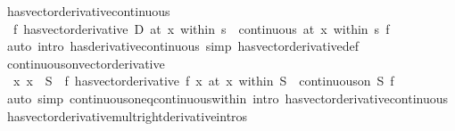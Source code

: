 \begin{isabellebody}
\endisatagproof
{\isafoldproof}%
%
\isadelimproof
\isanewline
%
\endisadelimproof
\isanewline
{}\isamarkupfalse%
\ has{\isacharunderscore}{\kern0pt}vector{\isacharunderscore}{\kern0pt}derivative{\isacharunderscore}{\kern0pt}continuous{\isacharcolon}{\kern0pt}\isanewline
\ \ {\isachardoublequoteopen}{\isacharparenleft}{\kern0pt}f\ has{\isacharunderscore}{\kern0pt}vector{\isacharunderscore}{\kern0pt}derivative\ D{\isacharparenright}{\kern0pt}\ {\isacharparenleft}{\kern0pt}at\ x\ within\ s{\isacharparenright}{\kern0pt}\ {\isasymLongrightarrow}\ continuous\ {\isacharparenleft}{\kern0pt}at\ x\ within\ s{\isacharparenright}{\kern0pt}\ f{\isachardoublequoteclose}\isanewline
%
\isadelimproof
\ \ %
\endisadelimproof
%
\isatagproof
{}\isamarkupfalse%
\ {\isacharparenleft}{\kern0pt}auto\ intro{\isacharcolon}{\kern0pt}\ has{\isacharunderscore}{\kern0pt}derivative{\isacharunderscore}{\kern0pt}continuous\ simp{\isacharcolon}{\kern0pt}\ has{\isacharunderscore}{\kern0pt}vector{\isacharunderscore}{\kern0pt}derivative{\isacharunderscore}{\kern0pt}def{\isacharparenright}{\kern0pt}%
\endisatagproof
{\isafoldproof}%
%
\isadelimproof
\isanewline
%
\endisadelimproof
\isanewline
{}\isamarkupfalse%
\ continuous{\isacharunderscore}{\kern0pt}on{\isacharunderscore}{\kern0pt}vector{\isacharunderscore}{\kern0pt}derivative{\isacharcolon}{\kern0pt}\isanewline
\ \ {\isachardoublequoteopen}{\isacharparenleft}{\kern0pt}{\isasymAnd}x{\isachardot}{\kern0pt}\ x\ {\isasymin}\ S\ {\isasymLongrightarrow}\ {\isacharparenleft}{\kern0pt}f\ has{\isacharunderscore}{\kern0pt}vector{\isacharunderscore}{\kern0pt}derivative\ f{\isacharprime}{\kern0pt}\ x{\isacharparenright}{\kern0pt}\ {\isacharparenleft}{\kern0pt}at\ x\ within\ S{\isacharparenright}{\kern0pt}{\isacharparenright}{\kern0pt}\ {\isasymLongrightarrow}\ continuous{\isacharunderscore}{\kern0pt}on\ S\ f{\isachardoublequoteclose}\isanewline
%
\isadelimproof
\ \ %
\endisadelimproof
%
\isatagproof
{}\isamarkupfalse%
\ {\isacharparenleft}{\kern0pt}auto\ simp{\isacharcolon}{\kern0pt}\ continuous{\isacharunderscore}{\kern0pt}on{\isacharunderscore}{\kern0pt}eq{\isacharunderscore}{\kern0pt}continuous{\isacharunderscore}{\kern0pt}within\ intro{\isacharbang}{\kern0pt}{\isacharcolon}{\kern0pt}\ has{\isacharunderscore}{\kern0pt}vector{\isacharunderscore}{\kern0pt}derivative{\isacharunderscore}{\kern0pt}continuous{\isacharparenright}{\kern0pt}%
\endisatagproof
{\isafoldproof}%
%
\isadelimproof
\isanewline
%
\endisadelimproof
\isanewline
{}\isamarkupfalse%
\ has{\isacharunderscore}{\kern0pt}vector{\isacharunderscore}{\kern0pt}derivative{\isacharunderscore}{\kern0pt}mult{\isacharunderscore}{\kern0pt}right{\isacharbrackleft}{\kern0pt}derivative{\isacharunderscore}{\kern0pt}intros{\isacharbrackright}{\kern0pt}{\isacharcolon}{\kern0pt}\isanewline

\end{isabellebody}
